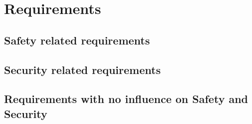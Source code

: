 \section{Requirements}
\label{chapter6}


\subsection{Safety related requirements}





\subsection{Security related requirements}


\subsection{Requirements with no influence on Safety and Security}
